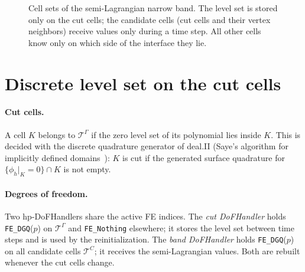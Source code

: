 \documentclass[11pt,a4paper]{article}
\newcommand{\T}{\mathcal{T}}
\begin{document}
\begin{figure}[ht]
\begin{tikzpicture}[scale=0.62]
  \end{tikzpicture}
  \hspace{0.6cm}
  \caption{Cell sets of the semi-Lagrangian narrow band. The level set is stored only on the cut
  cells; the candidate cells (cut cells and their vertex neighbors) receive values only during a
  time step. All other cells know only on which side of the interface they lie.}
  \label{fig:sets}
\end{figure}

\FloatBarrier
\section{Discrete level set on the cut cells}
\label{sec:cutcells}

\paragraph{Cut cells.}
A cell $K$ belongs to $\T^{\Gamma}$ if the zero level set of its polynomial lies inside $K$. This
is decided with the discrete quadrature generator of deal.II (Saye's algorithm for implicitly
defined domains~\cite{Saye2015}): $K$ is cut if the generated surface quadrature for
$\{\phi_h|_K = 0\} \cap K$ is not empty.

\paragraph{Degrees of freedom.}
Two hp-DoFHandlers share the active FE indices. The \emph{cut DoFHandler} holds
\texttt{FE\_DGQ}($p$) on $\T^{\Gamma}$ and \texttt{FE\_Nothing} elsewhere; it stores the level set
between time steps and is used by the reinitialization. The \emph{band DoFHandler} holds
\texttt{FE\_DGQ}($p$) on all candidate cells $\T^{C}$; it receives the semi-Lagrangian values.
Both are rebuilt whenever the cut cells change.
\end{document}

